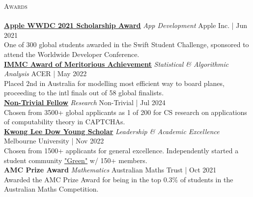 \documentclass[a4paper]{article}
\newcommand{\lineunder} {
    \vspace*{-8pt} \\
    \hspace*{-10pt} \hrulefill \\
}
\newcommand{\header} [1] {
    {\hspace*{-10pt}\vspace*{6pt} \textsc{#1}}
    \vspace*{-6pt} \lineunder
}
\begin{document}
\header{Awards}
\href{https://www.wwdcscholars.com/s/DF1A5147-A993-44E4-8739-8A050139A7BA/2021}{\textbf{\ul{Apple WWDC 2021 Scholarship Award}}} \textit{App Development} \hfill Apple Inc. | Jun 2021\\
One of 300 global students awarded in the Swift Student Challenge, sponsored to attend the Worldwide Developer Conference.\\
\vspace*{1.5mm}
\href{https://www.acer.org/au/discover/article/bray-park-and-caulfield-grammar-schools-top-maths-challenge}{\textbf{\ul{IMMC Award of Meritorious Achievement}}} \textit{Statistical \& Algorithmic Analysis} \hfill ACER | May 2022\\
Placed 2nd in Australia for modelling most efficient way to board planes, proceeding to the intl finals out of 58 global finalists.\\
\vspace*{1.5mm}
\href{https://www.non-trivial.org/}{\textbf{\ul{Non-Trivial Fellow}}} \textit{Research} \hfill Non-Trivial | Jul 2024\\
Chosen from 3500+ global applicants as 1 of 200 for CS research on applications of computability theory in CAPTCHAs.\\
\vspace*{1.5mm}
\href{https://www.linkedin.com/posts/caulfield-grammar-school_caulfieldgrammar2022-activity-7001816876439781376-DZpH}{\textbf{\ul{Kwong Lee Dow Young Scholar}}} \textit{Leadership \& Academic Excellence} \hfill Melbourne University | Nov 2022\\
Chosen from 1500+ applicants for general excellence.
Independently started a student community \href{https://garv-shah.github.io/green/}{"Green"} w/ 150+ members.\\
\vspace*{1.5mm}
\textbf{AMC Prize Award} \textit{Mathematics} \hfill Australian Maths Trust | Oct 2021\\
Awarded the AMC Prize Award for being in the top 0.3\% of students in the Australian Maths Competition.\\
\vspace*{1.5mm}
\end{document}
